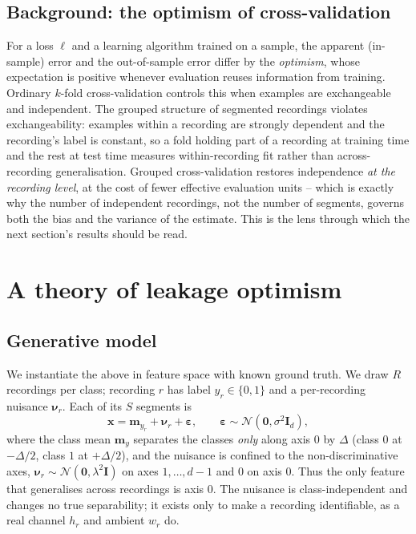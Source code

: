\documentclass[11pt]{article}
\begin{document}
\subsection{Background: the optimism of cross-validation}
For a loss $\ell$ and a learning algorithm trained on a sample, the apparent (in-sample) error and the out-of-sample error differ by the \emph{optimism}, whose expectation is positive whenever evaluation reuses information from training. Ordinary $k$-fold cross-validation controls this when examples are exchangeable and independent. The grouped structure of segmented recordings violates exchangeability: examples within a recording are strongly dependent and the recording's label is constant, so a fold holding part of a recording at training time and the rest at test time measures within-recording fit rather than across-recording generalisation. Grouped cross-validation restores independence \emph{at the recording level}, at the cost of fewer effective evaluation units -- which is exactly why the number of independent recordings, not the number of segments, governs both the bias and the variance of the estimate. This is the lens through which the next section's results should be read.

\section{A theory of leakage optimism}
\label{sec:theory}
\subsection{Generative model}
We instantiate the above in feature space with known ground truth. We draw $R$ recordings per class; recording $r$ has label $y_r\in\{0,1\}$ and a per-recording nuisance $\boldsymbol{\nu}_r$. Each of its $S$ segments is
\begin{equation}
\mathbf{x} = \mathbf{m}_{y_r} + \boldsymbol{\nu}_r + \boldsymbol{\varepsilon}, \qquad \boldsymbol{\varepsilon}\sim\mathcal{N}(\mathbf{0},\sigma^2\mathbf{I}_d),
\label{eq:gen}
\end{equation}
where the class mean $\mathbf{m}_y$ separates the classes \emph{only} along axis $0$ by $\Delta$ (class $0$ at $-\Delta/2$, class $1$ at $+\Delta/2$), and the nuisance is confined to the non-discriminative axes, $\boldsymbol{\nu}_r\sim\mathcal{N}(\mathbf{0},\lambda^2\mathbf{I})$ on axes $1,\dots,d{-}1$ and $0$ on axis $0$. Thus the only feature that generalises across recordings is axis $0$. The nuisance is class-independent and changes no true separability; it exists only to make a recording identifiable, as a real channel $h_r$ and ambient $w_r$ do.
\end{document}
